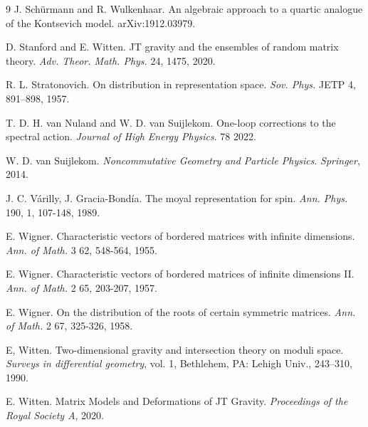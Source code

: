 \documentclass[10pt]{article}
\begin{document}
\begin{thebibliography}{9}
J. Schürmann and  R. Wulkenhaar. An algebraic approach to a quartic analogue of the Kontsevich model. 	arXiv:1912.03979.

D. Stanford and E. Witten. JT gravity and the ensembles of random matrix theory. \textit{Adv.
	Theor. Math. Phys.} 24, 1475, 2020.

R. L. Stratonovich. On distribution in representation space. \textit{Sov. Phys.} JETP 4, 891–898, 1957.

T. D. H. van Nuland and W. D. van Suijlekom. One-loop corrections to the spectral action. \textit{Journal of High Energy Physics}. 78 2022.

W. D.  van Suijlekom. {\it Noncommutative Geometry and Particle Physics}. \textit{Springer}, 2014. 

J. C. V\'arilly, J. Gracia-Bond\'ia.
The moyal representation for spin.
\textit{Ann. Phys.}
190, 1, 107-148,
1989.

E. Wigner. Characteristic vectors of bordered matrices with infinite dimensions. \textit{Ann. of Math.} 3 62, 548-564, 1955.

E. Wigner. Characteristic vectors of bordered matrices of infinite dimensions II. \textit{Ann. of Math.} 2 65, 203-207, 1957.

E. Wigner. On the distribution of the roots of certain symmetric matrices. \textit{Ann. of Math.} 2 67, 325-326, 1958. 

E, Witten. Two-dimensional gravity and intersection theory on moduli space.\textit{ Surveys in differential geometry}, vol. 1, Bethlehem, PA: Lehigh Univ.,  243–310, 1990.

E. Witten. Matrix Models and Deformations of JT Gravity. \textit{Proceedings of the Royal Society A}, 2020. 



\end{thebibliography}
\end{document}
